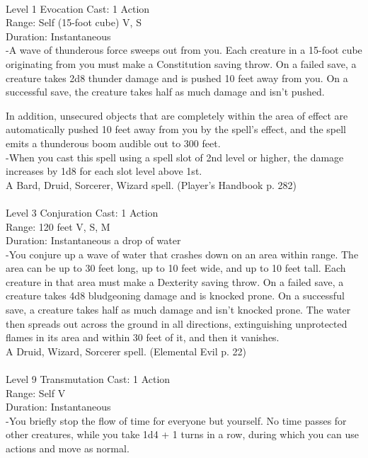 \documentclass[10pt,twocolumn]{report}
\begin{document}
 \\
Level 1 \quad Evocation \quad Cast: 1 Action\\
Range: Self (15-foot cube) \quad V, S\\
Duration: Instantaneous \quad \\
-A wave of thunderous force sweeps out from you.
Each creature in a 15-foot cube originating from you must make a Constitution saving throw. On a failed save, a creature takes 2d8 thunder damage and is pushed 10 feet away from you. On a successful save, the creature takes half as much damage and isn’t pushed.

In addition, unsecured objects that are completely within the area of effect are automatically pushed 10 feet away from you by the spell’s effect, and the spell emits a thunderous boom audible out to 300 feet.\\
-When you cast this spell using a spell slot of 2nd level or higher, the damage increases by 1d8 for each slot level above 1st.\\
A Bard, Druid, Sorcerer, Wizard spell. (Player's Handbook p. 282) \\


 \\
Level 3 \quad Conjuration \quad Cast: 1 Action\\
Range: 120 feet \quad V, S, M\\
Duration: Instantaneous \quad a drop of water\\
-You conjure up a wave of water that crashes down on an area within range. The area can be up to 30 feet long, up to 10 feet wide, and up to 10 feet tall. Each creature in that area must make a Dexterity saving throw. On a failed save, a creature takes 4d8 bludgeoning damage and is knocked prone. On a successful save, a creature takes half as much damage and isn’t knocked prone. The water then spreads out across the ground in all directions, extinguishing unprotected flames in its area and within 30 feet of it, and then it vanishes.\\
A Druid, Wizard, Sorcerer spell. (Elemental Evil p. 22) \\


 \\
Level 9 \quad Transmutation \quad Cast: 1 Action\\
Range: Self \quad V\\
Duration: Instantaneous \quad \\
-You briefly stop the flow of time for everyone but yourself. No time passes for other creatures, while you take 1d4 + 1 turns in a row, during which you can use actions and move as normal.
\end{document}
